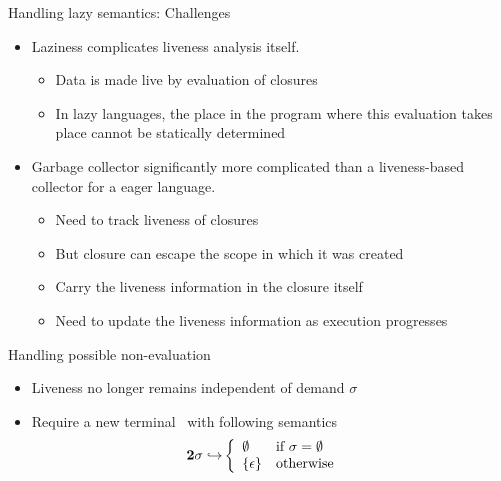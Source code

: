 \documentclass[xcolor=x11names,compress,mathserif]{beamer}
\renewcommand{\(}{\begin{columns}}
\renewcommand{\)}{\end{columns}}
\newcommand{\<}[1]{\begin{column}{#1}}
\renewcommand{\>}{\end{column}}
\begin{document}
\begin{frame}{Handling lazy semantics: Challenges}
\normalsize
  \begin{itemize}\itemsep2em
  \item Laziness complicates liveness analysis itself. 
    \begin{itemize}
    \item Data is made live by evaluation of closures
    \item In lazy languages, the place in the program
      where this evaluation takes place cannot be statically determined
    \end{itemize}
    \pause
  \item Garbage collector significantly more complicated than a liveness-based
    collector for a eager language.
    \begin{itemize}
    \item Need to track liveness of closures
    \item But closure can escape the scope in which it was created
    \item Carry the liveness information in the closure itself
    \item Need to update the liveness information as execution progresses
    \end{itemize}
  \end{itemize}
\end{frame}

\begin{frame} {Handling possible non-evaluation}
  \begin{itemize}
  \item Liveness no longer remains independent of demand $\sigma$
  \item Require a new terminal \clazy\ with following semantics
    \begin{align*}
      {\mathbf{2}}\sigma \hookrightarrow & \left\{ 
      \begin{array}{ll}
        \emptyset&\mbox{if}~\sigma = \emptyset\\
        \{\epsilon\} & \mbox{otherwise}
      \end{array}\right.
    \end{align*}
  \end{itemize}
\end{frame}
\end{document}
